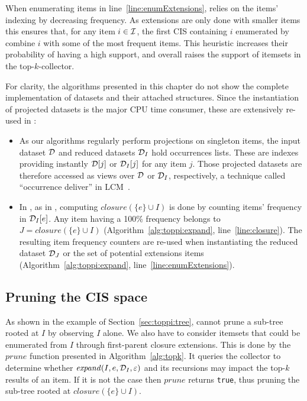 When enumerating items in line~\ref{line:enumExtensions},
\toppi relies on the items' indexing by decreasing frequency.
As extensions are only done with smaller items this ensures that, for any item $i\in{\cal I}$,
the first CIS containing $i$ enumerated by \toppi combine $i$ with some of the most frequent items.
This heuristic increases their probability of having a high support,
and overall raises the support of itemsets in the top-$k$-collector.

For clarity, the algorithms presented in this chapter do not show the complete implementation of datasets
and their attached structures.
Since the instantiation of projected datasets is the major CPU time consumer,
these are extensively re-used in \toppi:

\begin{itemize}
	\item As our algorithms regularly perform projections on singleton items,
	the input dataset $\cal D$ and reduced datasets ${\cal D}_I$ hold occurrences lists.
	These are indexes providing instantly ${\cal D}[j]$ or ${\cal D}_I[j]$ for any item $j$.
	Those projected datasets are therefore accessed as views over ${\cal D}$ or ${\cal D}_I$, respectively,
	a technique called ``occurrence deliver'' in LCM~\cite{UnoFIMI03}.

	\item In \toppi, as in \jlcm, computing $\mathit{closure(\{e\}\cup I)}$ is done by counting
	items' frequency in ${\cal D}_I[e]$.
	Any item having a 100\% frequency belongs to $J = \mathit{closure(\{e\}\cup I)}$ (Algorithm~\ref{alg:toppi:expand}, line~\ref{line:closure}).
	The resulting item frequency counters are re-used when instantiating the reduced dataset ${\cal D}_J$
	or the set of potential extensions items (Algorithm~\ref{alg:toppi:expand}, line~\ref{line:enumExtensions}).
\end{itemize}




\subsection{Pruning the CIS space}
\label{sec:toppi:pruning}



As shown in the example of Section~\ref{sec:toppi:tree},
\toppi cannot prune a sub-tree rooted at $I$ by observing $I$ alone.
We also have to consider itemsets that could be enumerated from $I$ through first-parent closure extensions.
This is done by the $\mathit{prune}$ function presented in Algorithm~\ref{alg:topk}.
It queries the collector to determine whether $\mathit{expand}(I,e,{\cal D}_I,\varepsilon)$
and its recursions may impact the top-$k$ results of an item.
If it is not the case then $\mathit{prune}$ returns \verb|true|,
thus pruning the sub-tree rooted at $\mathit{closure}(\{e\} \cup I)$.

